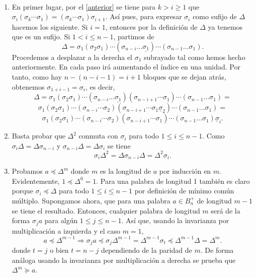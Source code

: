 \documentclass[bibtex, anon]{TEMat-article}
\begin{document}
\begin{demostracion}\
	\begin{enumerate}
		\item En primer lugar, por el \cref{anterior} se tiene para $k>i\geq 1$ que $\sigma_i(\sigma_k\cdots\sigma_1)=(\sigma_k\cdots\sigma_1)\sigma_{i+1}$. 
		Así pues, para expresar $\sigma_i$ como sufijo de $\Delta$ hacemos los siguiente. Si $i=1$, entonces por la definición de $\Delta$ ya tenemos que es un sufijo. Si $1<i\leq n-1$, partimos de
		\[
		\Delta=\sigma_1(\sigma_2\sigma_1)\cdots(\sigma_{n-i}\dots\underline{\sigma_1})\cdots(\sigma_{n-1}\dots\sigma_1).
		\]
		Procedemos a desplazar a la derecha el $\sigma_1$ subrayado tal como hemos hecho anteriormente. En cada paso irá aumentando el índice en una unidad. Por tanto, como hay $n-(n-i-1)=i+1$ bloques que se dejan atrás, obtenemos $\sigma_{1+i-1}=\sigma_i$, es decir,
		\[
		\Delta=\sigma_1(\sigma_2\sigma_1)\cdots(\sigma_{n-i}\dots\underline{\sigma_1})(\sigma_{n-i+1}\cdots\sigma_1)\cdots(\sigma_{n-1}\dots\sigma_1)=
		\]
		\[
		\sigma_1(\sigma_2\sigma_1)\cdots(\sigma_{n-i}\cdots\sigma_2)(\sigma_{n-i+1}\cdots\sigma_1\underline{\sigma}_2)\cdots(\sigma_{n-1}\dots\sigma_1)=
		\]
		\[
		\sigma_1(\sigma_2\sigma_1)\cdots(\sigma_{n-i}\cdots\sigma_2)(\sigma_{n-i+1}\cdots\sigma_1)\cdots(\sigma_{n-1}\dots\sigma_1)\underline{\sigma}_i.
		\]
		
		
		\item Basta probar que $\Delta^2$ conmuta con $\sigma_i$ para todo $1\leq i\leq n-1$. Como $\sigma_i\Delta=\Delta\sigma_{n-i}$ y $\sigma_{n-i}\Delta=\Delta\sigma_i$ se tiene
		\[
		\sigma_i\Delta^2=\Delta\sigma_{n-i}\Delta=\Delta^2\sigma_i.
		\]
		
		
		\item Probamos $a\preccurlyeq\Delta^m$ donde $m$ es la longitud de $a$ por inducción en $m$. Evidentemente, $1\preccurlyeq\Delta^0=1$. Para una palabra de longitud 1 también es claro porque $\sigma_i\preccurlyeq\Delta$ para todo $1\leq i\leq n-1$ por definición de mínimo común múltiplo. Supongamos ahora, que para una palabra $a\in B_n^+$ de longitud $m-1$ se tiene el resultado. Entonces, cualquier palabra de longitud $m$ será de la forma $\sigma_j a$ para algún $1\leq j\leq n-1$. Así que, usando la invarianza por multiplicación a izquierda y el caso $m=1$,
		\[
		a\preccurlyeq\Delta^{m-1}\Rightarrow \sigma_j a\preccurlyeq \sigma_j\Delta^{m-1} =\Delta^{m-1}\sigma_t\preccurlyeq \Delta^{m-1}\Delta=\Delta^{m}.
		\]
		donde $t=j$ o bien $t=n-j$ dependiendo de la paridad de $m$. De forma análoga usando la invarianza por multiplicación a derecha se prueba que $\Delta^m\succcurlyeq a$.
	\end{enumerate}
	
\end{demostracion}
\end{document}
